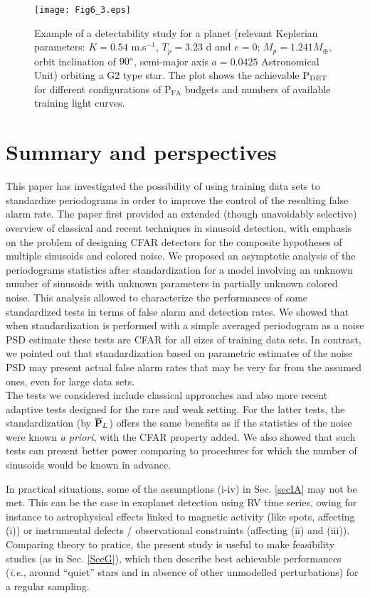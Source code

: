 \documentclass[journal]{IEEEtran}
\begin{document}
 \begin{figure}[htb!] \centering
	\texttt{[image: Fig6\_3.eps]}
	\caption{{Example of a detectability study for a  planet (relevant Keplerian parameters:  $K = 0.54$ m.s$^{-1}$, $T_p  = 3.23$ d and $e=0$; $M_p = 1.241 M_\oplus$, {orbit inclination of $90 \degree$}, semi-major axis $a     =   0.0425$ Astronomical Unit) orbiting a G2 type star. The plot shows the achievable $\rm P_{DET}$ for different configurations of $\textrm{P}_{\textrm{FA}}$ budgets and numbers of available training light curves.  
	}}
	\label{Fig6}
\end{figure}

\section{Summary and perspectives}
\label{conc}
This paper has  investigated the possibility of using training data sets to standardize periodograms in order to improve the control of the resulting false alarm rate. The paper first { provided}  an extended (though unavoidably selective)  overview of classical and recent techniques in sinusoid detection, with emphasis  on the problem of designing CFAR detectors for the composite hypotheses of multiple sinusoids and colored noise.
We proposed an asymptotic analysis of the periodograms statistics after standardization for a model involving an unknown number of sinusoids with unknown parameters in partially unknown colored noise. This analysis allowed
to  characterize the performances of some standardized tests in terms of false alarm and detection rates. We showed that when standardization is performed with a simple averaged periodogram as a noise PSD estimate  these tests are CFAR for all sizes of training data sets. In contrast, we pointed out that standardization based on parametric estimates of the noise PSD may present  actual false alarm rates that may be very far from the assumed ones, even for large data sets.\\
The tests we considered include classical approaches and also more recent adaptive tests designed for the rare and weak setting. For the latter tests, the standardization (by $\overline{\bf{P}}_L$) offers the same benefits as if the statistics of the noise were known {\textit{a priori}}, with the CFAR property added. 
{We also showed that such tests can present better power comparing to procedures for which the number of sinusoids would be known in advance.}

{ In practical  situations, some of  the assumptions (i-iv) in Sec. \ref{secIA} may not be met. This can be the case  in exoplanet detection  using RV time series, owing for instance to astrophysical effects linked to magnetic activity (like spots, affecting (i)) or instrumental defects / observational constraints
 (affecting (ii) and (iii)).  Comparing theory to pratice, the present study is useful to   make feasibility studies (as in Sec. \ref{SecG}), which then describe best achievable performances (\textit{i.e.}, around ``quiet'' stars and in absence of other unmodelled perturbations) for a regular sampling. }
 
\end{document}
